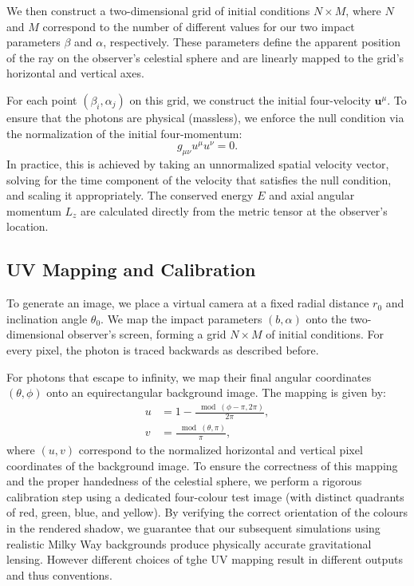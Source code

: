\documentclass[11pt]{book}
\begin{document}
We then construct a two-dimensional grid of initial conditions \(N \times M\), where \(N\) and \(M\) correspond to the number of different values for our two impact parameters \(\beta\) and \(\alpha\), respectively. These parameters define the apparent position of the ray on the observer's celestial sphere and are linearly mapped to the grid's horizontal and vertical axes.

For each point \((\beta_i, \alpha_j)\) on this grid, we construct the initial four-velocity \(\bm{u}^\mu\). To ensure that the photons are physical (massless), we enforce the null condition via the normalization of the initial four-momentum:
\begin{equation}
    g_{\mu\nu} u^\mu u^\nu = 0.
\end{equation}
In practice, this is achieved by taking an unnormalized spatial velocity vector, solving for the time component of the velocity that satisfies the null condition, and scaling it appropriately. The conserved energy \(E\) and axial angular momentum \(L_z\) are calculated directly from the metric tensor at the observer's location.

\subsection{UV Mapping and Calibration}

To generate an image, we place a virtual camera at a fixed radial distance \(r_0\) and inclination angle \(\theta_0\). We map the impact parameters \((b, \alpha)\) onto the two-dimensional observer's screen, forming a grid \(N \times M\) of initial conditions. For every pixel, the photon is traced backwards as described before.


For photons that escape to infinity, we map their final angular coordinates \((\theta, \phi)\) onto an equirectangular background image. The mapping is given by:
\begin{align}
    u &= 1 - \frac{\mod(\phi - \pi, 2\pi)}{2\pi}, \\
    v &= \frac{\mod(\theta, \pi)}{\pi},
\end{align}
where \((u, v)\) correspond to the normalized horizontal and vertical pixel coordinates of the background image. To ensure the correctness of this mapping and the proper handedness of the celestial sphere, we perform a rigorous calibration step using a dedicated four-colour test image (with distinct quadrants of red, green, blue, and yellow). By verifying the correct orientation of the colours in the rendered shadow, we guarantee that our subsequent simulations using realistic Milky Way backgrounds produce physically accurate gravitational lensing. However different choices of tghe UV mapping result in different outputs and thus conventions.
\end{document}
